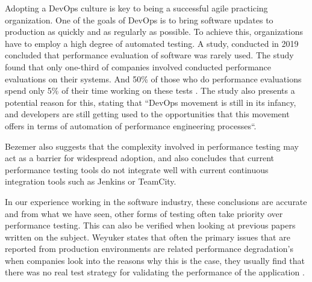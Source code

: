 Adopting a DevOps culture is key to being a successful agile practicing organization. One of the goals of DevOps is to bring software updates to production as quickly and as regularly as possible. To achieve this, organizations have to employ a high degree of automated testing. A study, conducted in 2019 concluded that performance evaluation of software was rarely used. The study found that only one-third of companies involved conducted performance evaluations on their systems. And 50\% of those who do performance evaluations spend only 5\% of their time working on these tests \cite{bezemer2019performance}. The study also presents a potential reason for this, stating that ``DevOps movement is
still in its infancy, and developers are still getting used to the opportunities that this movement offers in terms of automation of
performance engineering processes``.

Bezemer also suggests that the complexity involved in performance testing may act as a barrier for widespread adoption, and also concludes that current performance testing tools do not integrate well with current continuous integration tools such as Jenkins or TeamCity.

In our experience working in the software industry, these conclusions are accurate and from what we have seen, other forms of testing often take priority over performance testing. This can also be verified when looking at previous papers written on the subject. Weyuker states that often the primary issues that are reported from production environments are related performance degradation's when companies look into the reasons why this is the case, they usually find that there was no real test strategy for validating the performance of the application \cite{888628}. 